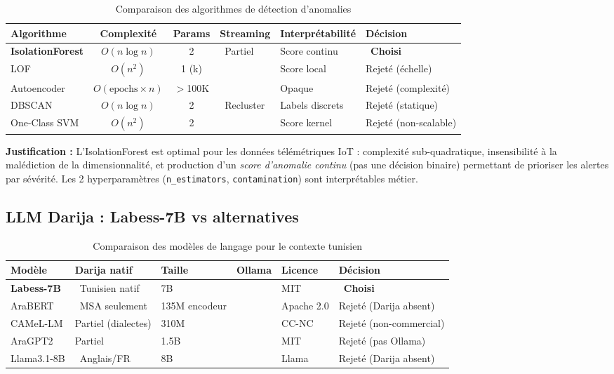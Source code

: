 \documentclass[12pt,a4paper,oneside]{report}
\newcommand{\code}[1]{\texttt{\small\color{farmgray}#1}}
\newcommand{\yes}{\ding{52}}
\newcommand{\no}{\ding{56}}
\begin{document}
\begin{table}[H]\centering
\caption{Comparaison des algorithmes de détection d'anomalies}
\label{tab:anomaly_compare}
\small
\begin{tabular}{lcclll}
\toprule
\textbf{Algorithme}&\textbf{Complexité}&\textbf{Params}&\textbf{Streaming}&\textbf{Interprétabilité}&\textbf{Décision}\\
\midrule
\textbf{IsolationForest} & $O(n \log n)$ & 2   & \yes~Partiel & Score continu & \yes~\textbf{Choisi}\\
LOF                      & $O(n^2)$      & 1 (k) & \no          & Score local    & Rejeté (échelle)\\
Autoencoder              & $O(\text{epochs} \times n)$ & $>$100K & \no & Opaque & Rejeté (complexité)\\
DBSCAN                   & $O(n \log n)$ & 2   & \no~Recluster & Labels discrets & Rejeté (statique)\\
One-Class SVM            & $O(n^2)$      & 2   & \no          & Score kernel   & Rejeté (non-scalable)\\
\bottomrule
\end{tabular}
\end{table}

\noindent\textbf{Justification :} L'IsolationForest est optimal pour les données
télémétriques IoT : complexité sub-quadratique, insensibilité à la malédiction de la
dimensionnalité, et production d'un \textit{score d'anomalie continu} (pas une décision
binaire) permettant de prioriser les alertes par sévérité. Les 2 hyperparamètres
(\code{n\_estimators}, \code{contamination}) sont interprétables métier.

\subsection{LLM Darija : Labess-7B vs alternatives}

\begin{table}[H]\centering
\caption{Comparaison des modèles de langage pour le contexte tunisien}
\label{tab:llm_compare}
\small
\begin{tabular}{lllcll}
\toprule
\textbf{Modèle}&\textbf{Darija natif}&\textbf{Taille}&\textbf{Ollama}&\textbf{Licence}&\textbf{Décision}\\
\midrule
\textbf{Labess-7B} & \yes~Tunisien natif & 7B & \yes & MIT    & \yes~\textbf{Choisi}\\
AraBERT            & \no~MSA seulement  & 135M encodeur & \no & Apache 2.0 & Rejeté (Darija absent)\\
CAMeL-LM           & Partiel (dialectes) & 310M & \no & CC-NC  & Rejeté (non-commercial)\\
AraGPT2            & Partiel             & 1.5B & \no & MIT    & Rejeté (pas Ollama)\\
Llama3.1-8B        & \no~Anglais/FR     & 8B  & \yes & Llama  & Rejeté (Darija absent)\\
\bottomrule
\end{tabular}
\end{table}
\end{document}

